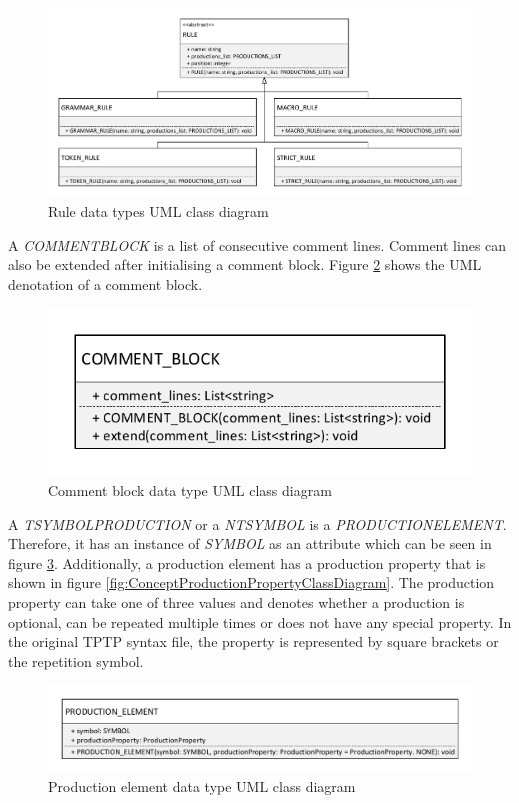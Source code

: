 \begin{figure}[H]
\centering
\includegraphics[width=1\textwidth]{images/Concept_uml_data_types_rules.pdf}
\caption{Rule data types UML class diagram}
\label{fig:ConceptRulesClassDiagram}
\end{figure}

A \textit{COMMENT\textunderscore BLOCK} is a list of consecutive comment lines. Comment lines can also be extended after initialising a comment block. Figure \ref{fig:ConceptCommentBlockClassDiagram} shows the UML denotation of a comment block.

\begin{figure}[H]
\centering
\includegraphics[width=.5\textwidth]{images/Concept_uml_data_types_comment_block.pdf}
\caption{Comment block data type UML class diagram}
\label{fig:ConceptCommentBlockClassDiagram}
\end{figure}

A \textit{T\textunderscore SYMBOL\textunderscore PRODUCTION} or a\textit{ NT\textunderscore SYMBOL} is a \textit{PRODUCTION\textunderscore ELEMENT}. Therefore, it has an instance of \textit{SYMBOL} as an attribute which can be seen in figure \ref{fig:ConceptProductionElementClassDiagram}. Additionally, a production element has a production property that is shown in figure \ref{fig:ConceptProductionPropertyClassDiagram}.
The production property can take one of three values and denotes whether a production is optional, can be repeated multiple times or does not have any special property.
In the original \ac{TPTP} syntax file, the property is represented by square brackets or the repetition symbol. 

\begin{figure}[H]
\centering
\includegraphics[width=.8\textwidth]{images/Concept_uml_data_types_production_element.pdf}
\caption{Production element data type UML class diagram}
\label{fig:ConceptProductionElementClassDiagram}
\end{figure}

